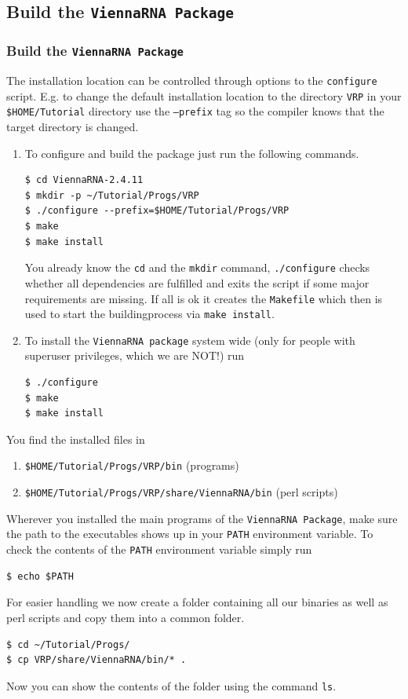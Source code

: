 \documentclass[a4paper]{article}
\newcommand{\frametitle}[1]{\subsubsection{#1}}
\begin{document}
\subsection{Build the \texttt{ViennaRNA Package}}
\frametitle{Build the \texttt{ViennaRNA Package}}
The installation location can be controlled through options to the
\texttt{configure} script. E.g. to change the default installation
location to the directory \texttt{VRP} in your \texttt{\$HOME/Tutorial} 
directory use the \texttt{--prefix} tag so the compiler knows that the 
target directory is changed.

\begin{enumerate}
\item To configure and build the package just run the following commands.
\begin{verbatim}
$ cd ViennaRNA-2.4.11
$ mkdir -p ~/Tutorial/Progs/VRP
$ ./configure --prefix=$HOME/Tutorial/Progs/VRP
$ make
$ make install
\end{verbatim}
You already know the \texttt{cd} and the \texttt{mkdir} command, \texttt{./configure} checks
whether all dependencies are fulfilled and exits the script if some major requirements are missing. 
If all is ok it creates the \texttt{Makefile} which then is used to start the buildingprocess via \texttt{make install}.
\item To install the \texttt{ViennaRNA package} system wide (only
for people with superuser privileges, which we are NOT!) run
\begin{verbatim}
$ ./configure
$ make
$ make install
\end{verbatim}
\end{enumerate}
\noindent
You find the installed files in 
\begin{enumerate}
\item \texttt{\$HOME/Tutorial/Progs/VRP/bin} (programs)
\item \texttt{\$HOME/Tutorial/Progs/VRP/share/ViennaRNA/bin} (perl scripts)
\end{enumerate}
Wherever you installed the main programs of the \texttt{ViennaRNA Package}, 
make sure the path to the executables shows up in your \texttt{PATH} 
environment variable. To check the contents of the \texttt{PATH} environment
variable simply run
\begin{verbatim}
$ echo $PATH
\end{verbatim}
For easier handling we now create a folder containing all our binaries as well as perl scripts and 
copy them into a common folder.
\begin{verbatim}
$ cd ~/Tutorial/Progs/
$ cp VRP/share/ViennaRNA/bin/* .
\end{verbatim}
Now you can show the contents of the folder using the command \texttt{ls}.
\end{document}
